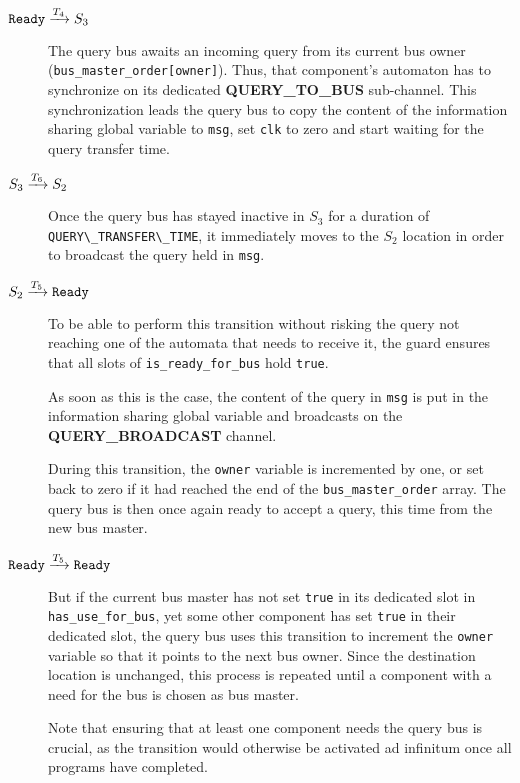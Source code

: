 \begin{description}
\item[$\texttt{Ready} \xrightarrow[]{T_{4}} S_3$]
   The query bus awaits an incoming query from its current bus owner
   (\lstinline!bus_master_order[owner]!). Thus, that component's automaton
   has to synchronize on its dedicated \textbf{QUERY\_TO\_BUS} sub-channel.
   This synchronization leads the query bus to copy the content of the
   information sharing global variable to \lstinline!msg!, set \lstinline!clk!
   to zero and start waiting for the query transfer time.

\item[$S_3 \xrightarrow[]{T_{6}} S_2$]
   Once the query bus has stayed inactive in $S_3$ for a duration of
   \lstinline!QUERY\_TRANSFER\_TIME!, it immediately moves to the $S_2$ location
   in order to broadcast the query held in \lstinline!msg!.

\item[$S_2 \xrightarrow[]{T_{5}} \texttt{Ready}$]
   To be able to perform this transition without risking the query not reaching
   one of the automata that needs to receive it, the guard ensures that all
   slots of \lstinline!is_ready_for_bus! hold \lstinline!true!.

   As soon as this is the case, the content of the query in \lstinline!msg! is
   put in the information sharing global variable and broadcasts on the
   \textbf{QUERY\_BROADCAST} channel.

   During this transition, the \lstinline!owner! variable is incremented by one,
   or set back to zero if it had reached the end of the
   \lstinline!bus_master_order! array. The query bus is then once again ready to
   accept a query, this time from the new bus master.

\item[$\texttt{Ready} \xrightarrow[]{T_{5}} \texttt{Ready}$]
   But if the current bus master has not set \lstinline!true! in its dedicated
   slot in \lstinline!has_use_for_bus!, yet some other component has set
   \lstinline!true! in their dedicated slot, the query bus uses this transition
   to increment the \lstinline!owner! variable so that it points to the next
   bus owner. Since the destination location is unchanged, this process is
   repeated until a component with a need for the bus is chosen as bus master.

   Note that ensuring that at least one component needs the query bus is
   crucial, as the transition would otherwise be activated ad infinitum once all
   programs have completed.
\end{description}
